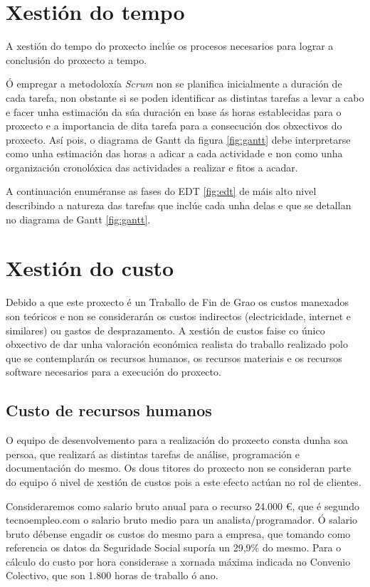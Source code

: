 \section{Xestión do tempo}
A xestión do tempo do proxecto inclúe os procesos necesarios para lograr a conclusión do proxecto a tempo.

Ó empregar a metodoloxía \emph{Scrum} non se planifica inicialmente a duración de cada tarefa, non obstante si se poden identificar as distintas tarefas a levar a cabo e facer unha estimación da súa duración en base ás horas establecidas para o proxecto e a importancia de dita tarefa para a consecución dos obxectivos do proxecto. Así pois, o diagrama de Gantt da figura \ref{fig:gantt} debe interpretarse como unha estimación das horas a adicar a cada actividade e non como unha organización cronolóxica das actividades a realizar e fitos a acadar.

A continuación enuméranse as fases do EDT \ref{fig:edt} de máis alto nivel describindo a natureza das tarefas que inclúe cada unha delas e que se detallan no diagrama de Gantt \ref{fig:gantt}.

\section{Xestión do custo}
Debido a que este proxecto é un Traballo de Fin de Grao os custos manexados son teóricos e non se considerarán os custos indirectos (electricidade, internet e similares) ou gastos de desprazamento. A xestión de custos faise co único obxectivo de dar unha valoración económica realista do traballo realizado polo que se contemplarán os recursos humanos, os recursos materiais e os recursos software necesarios para a execución do proxecto.

\subsection{Custo de recursos humanos}
O equipo de desenvolvemento para a realización do proxecto consta dunha soa persoa, que realizará as distintas tarefas de análise, programación e documentación do mesmo. Os dous titores do proxecto non se consideran parte do equipo ó nivel de xestión de custos pois a este efecto actúan no rol de clientes.

Consideraremos como salario bruto anual para o recurso 24.000 \euro, que é segundo tecnoempleo.com\cite{InformeSalarios} o salario bruto medio para un analista/programador. Ó salario bruto débense engadir os custos do mesmo para a empresa, que tomando como referencia os datos da Seguridade Social\cite{TabCotizacion} suporía un 29,9\% do mesmo. Para o cálculo do custo por hora considerase a xornada máxima indicada no Convenio Colectivo\cite{BOEConvenio}, que son 1.800 horas de traballo ó ano.

